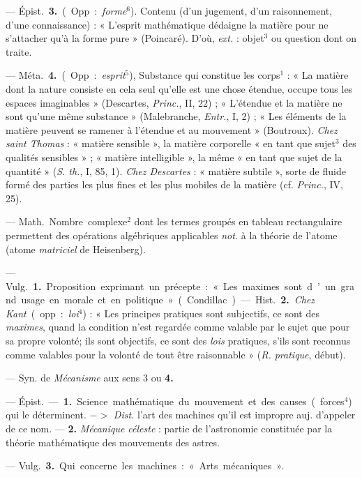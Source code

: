 \begin{itemize}[leftmargin=1cm, label=, itemsep=1pt]
— \si{Épist.} {\bf 3.} (Opp. : {\it forme}$^6$). Contenu (d'un jugement, d’un
raisonnement, d’une connaissance) : « L’esprit mathématique dédaigne la
matière pour ne s’attacher qu'à la forme pure » (Poincaré). D'où,
{\it ext.} : objet$^3$ ou question dont on traite.

— \si{Méta.} {\bf 4.} (Opp. : {\it esprit}$^5$), Substance qui constitue les
corps$^1$ : « La matière dont la nature consiste en cela seul qu’elle est une
chose étendue, occupe tous les espaces imaginables » (Descartes,
{\it Princ.}, II, 22) ; « L’étendue et la matière ne sont qu'une même
substance » (Malebranche, {\it Entr.}, I, 2) ; « Les éléments de la matière
peuvent se ramener à l'étendue et au mouvement » (Boutroux). {\it Chez saint
Thomas} : « matière sensible », la matière corporelle « en tant que sujet$^3$
des qualités sensibles » ; « matière intelligible », la même « en tant que
sujet de la quantité » ({\it S. th.}, I, 85, 1). {\it Chez Descartes} :
« matière subtile », sorte de fluide formé des parties les plus fines et les
plus mobiles de la matière (cf. {\it Princ.}, IV, 25).

 — \si{Math.} Nombre complexe$^2$ dont les termes groupés en
tableau rectangulaire permettent des opérations algébriques applicables
{\it not.} à la théorie de l'atome (atome {\it matriciel} de Heisenberg).

 — \si{Vulg.} {\bf 1.} Proposition exprimant un précepte : « Les
maximes sont d’un grand usage en morale et en politique » (Condillac). —
\si{Hist.}  {\bf 2.} {\it Chez Kant} (opp. : {\it loi}$^4$) : « Les principes
pratiques sont subjectifs, ce sont des {\it maximes}, quand la condition
n’est regardée comme valable
par le sujet que pour sa propre volonté; ils sont objectifs, ce sont des
{\it lois} pratiques, s’ils sont reconnus comme valables pour la volonté de
tout être raisonnable » ({\it R. pratique}, début).

 — Syn. de {\it Mécanisme} aux sens 3 ou {\bf 4.}

 — \si{Épist.} — {\bf 1.} Science mathématique du
mouvement et des causes (forces$^4$) qui le déterminent. $->$ {\it Dist.}
l'art des machines qu'il est impropre auj. d’appeler de ce nom. — {\bf 2.}
{\it Mécanique céleste} : partie de l'astronomie constituée par la théorie
mathématique des mouvements des astres.

 — \si{Vulg.} {\bf 3.} Qui concerne les machines :
« Arts mécaniques ».


\end{itemize}
